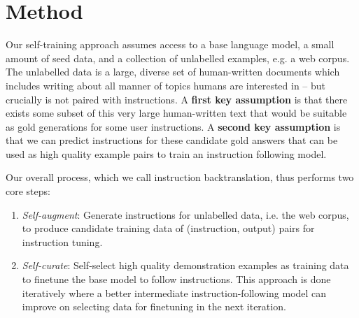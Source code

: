 \section{Method}
\label{methods}

Our self-training approach assumes access to a base language model, a small amount of seed data, and a collection of unlabelled examples, e.g. a web corpus. The unlabelled data is a large, diverse set of human-written documents which includes writing about all manner of topics humans are interested in -- but crucially is not paired with instructions. 
A \textbf{first key assumption} is that there exists some subset of this very large human-written text that would be suitable as gold generations for some user instructions.
A \textbf{second key assumption} is that we can predict  instructions for these candidate gold answers that can be used as high quality example pairs to train an instruction following model.


Our overall process,  which we call instruction backtranslation, 
 thus performs two core steps: 
\begin{enumerate}[leftmargin=*]
    \item {\em Self-augment}: Generate instructions for unlabelled data, i.e. the web corpus, to produce candidate training data of (instruction, output) pairs for instruction tuning. 
    \item {\em Self-curate}: Self-select high quality demonstration examples as training data to finetune the base model to follow instructions. This approach is done iteratively where a better intermediate instruction-following model can improve on selecting data for finetuning in the next iteration.
\end{enumerate}

